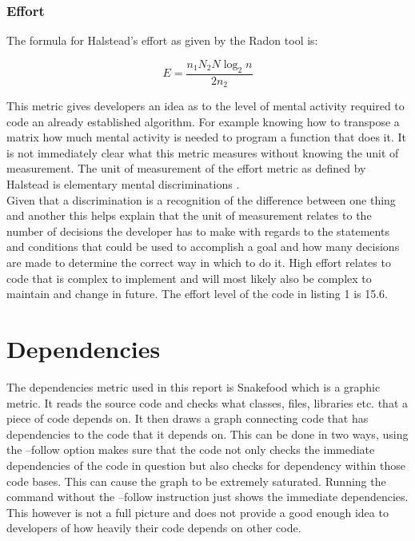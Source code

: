 \documentclass[10.5pt,journal, a4paper]{IEEEtran}
\begin{document}
\subsubsection{Effort}
\noindent
The formula for Halstead's effort as given by the Radon tool is:


\begin{equation}
 E = \frac{n_{1}N_{2}N\log_2n}{2n_{2}}
\end{equation}

\noindent
This metric gives developers an idea as to the level of mental activity required to code an already established algorithm. For example knowing how to transpose a matrix how much mental activity is needed to program a function that does it. It is not immediately clear what this metric measures without knowing the unit of measurement. The unit of measurement of the effort metric as defined by Halstead is elementary mental discriminations \cite{HALS}. \\

\noindent
Given that a discrimination is a recognition of the difference between one thing and another this helps explain that the unit of measurement relates to the number of decisions the developer has to make with regards to the statements and conditions that could be used to accomplish a goal and how many decisions are made to determine the correct way in which to do it. High effort relates to code that is complex to implement and will most likely also be complex to maintain and change in future. The effort level of the code in listing 1 is 15.6. 

\section{Dependencies}
\noindent
The dependencies metric used in this report is Snakefood which is a graphic metric. It reads the source code and checks what classes, files, libraries etc. that a piece of code depends on. It then draws a graph connecting code that has dependencies to the code that it depends on. This can be done in two ways, using the --follow option makes sure that the code not only checks the immediate dependencies of the code in question but also checks for dependency within those code bases. This can cause the graph to be extremely saturated. Running the command without the --follow instruction just shows the immediate dependencies. This however is not a full picture and does not provide a good enough idea to developers of how heavily their code depends on other code. \\
\end{document}
